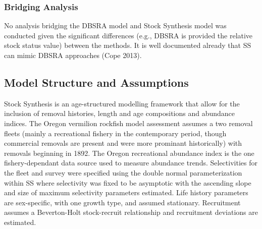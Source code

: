 \documentclass[11pt,
  english,
  a4paper,
]{article}
\begin{document}
\leavevmode\tagmcend\tagstructend\par


\hypertarget{bridging-analysis}{%
\subsubsection{Bridging Analysis}\label{bridging-analysis}}

\leavevmode\tagmcend\tagstructend


No analysis bridging the DBSRA model and Stock Synthesis model was conducted given the significant differences (e.g., DBSRA is provided the relative stock status value) between the methods. It is well documented already that SS can mimic DBSRA approaches {(Cope 2013)\leavevmode\tagmcend\tagstructend}.

\leavevmode\tagmcend\tagstructend\par


\hypertarget{model-structure-and-assumptions}{%
\subsection{Model Structure and Assumptions}\label{model-structure-and-assumptions}}

\leavevmode\tagmcend\tagstructend


Stock Synthesis is an age-structured modelling framework that allow for the inclusion of removal histories, length and age compositions and abundance indices. The Oregon vermilion rockfish model assessment assumes a two removal fleets (mainly a recreational fishery in the contemporary period, though commercial removals are present and were more prominant historically) with removals beginning in 1892. The Oregon recreational abundance index is the one fishery-dependant data source used to measure abundance trends. Selectivities for the fleet and survey were specified using the double normal parameterization within SS where selectivity was fixed to be asymptotic with the ascending slope and size of maximum selectivity parameters estimated. Life history parameters are sex-specific, with one growth type, and assumed stationary. Recruitment assumes a Beverton-Holt stock-recruit relationship and recruitment deviations are estimated.
\end{document}
